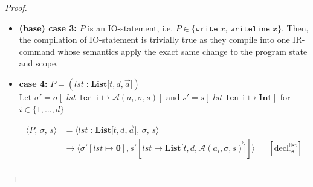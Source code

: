 \documentclass{article}
\begin{document}
\begin{proof}
\begin{itemize}
    \[
      \begin{aligned}
      \langle P,\, \sigma,\, s \rangle
      &=\langle \texttt{pass},\, \sigma,\, s \rangle \\
      &\rightarrow \langle \sigma ,\, s \rangle
      && [ \text{pass}_{\text{os}} ] \\   
      \end{aligned}
  \]
  
  and

  \[
      \begin{aligned}
      &\langle \mathcal{C}(P),\, e,\, \sigma,\, s,\, pc \rangle \\
      &= \langle \mathcal{C}(\texttt{pass}),\, e,\, \sigma,\, s,\, pc \rangle \\
      &= \langle \texttt{NOOP},\, e,\, \sigma,\, s,\, pc \rangle
      && \text{(definition of } \mathcal{C}\text{)} \\   
      &= \langle \epsilon,\, e,\, \sigma ,\, s,\, pc+1 \rangle
      && \text{(operational semantics)} \\ 
      \end{aligned}
  \]

    \item \textbf{(base) case 3:} $P$ is an IO-statement, i.e. $P \in \{ \texttt{write}\;x ,\, \texttt{writeline}\; x \}$. Then, the compilation of IO-statement is trivially true as they compile into one IR-command whose semantics apply the exact same change to the program state and scope.

    \item \textbf{case 4:} $P = (lst \;\texttt{:}\; \textbf{List[$t, d, \vec{a}$]})$\\

    Let $\sigma' = \sigma[\texttt{\_$lst$\_len\_i} \mapsto \mathcal{A}(a_i, \sigma, s)]$ and $s' = s[\texttt{\_$lst$\_len\_i} \mapsto \textbf{Int}]$ for $ i \in \{1,\dots,d\}$ 

        \[
          \begin{aligned}
          \langle P,\, \sigma,\, s \rangle
          &=\langle lst \;\texttt{:}\; \textbf{List[$t, d, \vec{a}$]},\, \sigma,\, s \rangle \\
          &\rightarrow \langle \sigma'[lst \mapsto \textbf{0}], s'[lst \mapsto \textbf{List[$t, d, \vec{\mathcal{A}(a_i, \sigma, s)}$]}] \rangle
          && [ \text{decl}^\text{list}_{\text{os}} ]\\   
          \end{aligned}
      \]
    

\end{itemize}
\end{proof}
\end{document}
